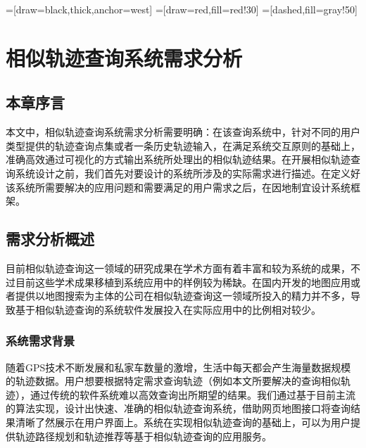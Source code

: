

\usetikzlibrary{arrows,shapes,positioning,shadows,trees}
=[draw=black,thick,anchor=west]
=[draw=red,fill=red!30]
=[dashed,fill=gray!50]

\chapter{相似轨迹查询系统需求分析}
\label{chap:system requirement specification}

\section{本章序言}
\label{sec:requirement introduction}
本文中，相似轨迹查询系统需求分析需要明确：在该查询系统中，针对不同的用户类型提供的轨迹查询点集或者一条历史轨迹输入，在满足系统交互原则的基础上，准确高效通过可视化的方式输出系统所处理出的相似轨迹结果。在开展相似轨迹查询系统设计之前，我们首先对要设计的系统所涉及的实际需求进行描述。在定义好该系统所需要解决的应用问题和需要满足的用户需求之后，在因地制宜设计系统框架。

\section{需求分析概述}
\label{sec:requirement background}
目前相似轨迹查询这一领域的研究成果在学术方面有着丰富和较为系统的成果，不过目前这些学术成果移植到系统应用中的样例较为稀缺。在国内开发的地图应用或者提供以地图搜索为主体的公司在相似轨迹查询这一领域所投入的精力并不多，导致基于相似轨迹查询的系统软件发展投入在实际应用中的比例相对较少。

\subsection{系统需求背景}
\label{subsec:general requirements}
随着GPS技术不断发展和私家车数量的激增，生活中每天都会产生海量数据规模的轨迹数据。用户想要根据特定需求查询轨迹（例如本文所要解决的查询相似轨迹），通过传统的软件系统难以高效查询出所期望的结果。我们通过基于目前主流的算法实现，设计出快速、准确的相似轨迹查询系统，借助网页地图接口将查询结果清晰了然展示在用户界面上。系统在实现相似轨迹查询的基础上，可以为用户提供轨迹路径规划和轨迹推荐等基于相似轨迹查询的应用服务。

